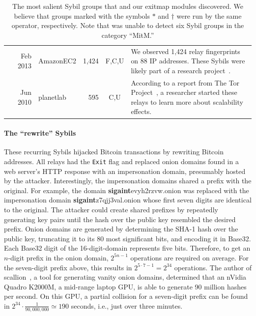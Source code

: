\begin{table}[ht!]
\begin{tabularx}{\textwidth}{l r l r c X}
& Feb 2013 & AmazonEC2 & 1,424 & \phantom{N,}F,C,U\phantom{,E} & We observed 1,424 relay fingerprints on
88 IP addresses.  These Sybils were likely part of a research
project~\cite{Biryukov2013a}. \\

& Jun 2010 & planetlab & 595 & \phantom{N,F,}C,U\phantom{,E} & According to a report from The Tor
Project~\cite{progressreport}, a researcher started these relays to learn more
about scalability effects. \\

\bottomrule

\end{tabularx}
\caption{The most salient Sybil groups that \sys and our exitmap modules
	discovered.  We believe that groups marked with the symbols $*$ and
	$\dagger$ were run by the same operator, respectively.  Note that \sys was
	unable to detect six Sybil groups in the category ``MitM.''}
\label{tab:sybils}
\end{table}

\paragraph{The ``rewrite'' Sybils}
These recurring Sybils hijacked Bitcoin transactions by rewriting Bitcoin
addresses.  All relays had the \texttt{Exit} flag and replaced onion domains
found in a web server's HTTP response with an impersonation domain, presumably
hosted by the attacker.  Interestingly, the impersonation domains shared a
prefix with the original.  For example, the domain
\textbf{sigaint}evyh2rzvw.onion was replaced with the impersonation domain
\textbf{sigaint}z7qjj3val.onion whose first seven digits are identical to the
original.  The attacker could create shared prefixes by repeatedly generating
key pairs until the hash over the public key resembled the desired prefix.
Onion domains are generated by determining the SHA-1 hash over the public key,
truncating it to its 80 most significant bits, and encoding it in Base32.  Each
Base32 digit of the 16-digit-domain represents five bits.  Therefore, to get an
$n$-digit prefix in the onion domain, $2^{5 n - 1}$ operations are required on
average.  For the seven-digit prefix above, this results in $2^{5 \cdot 7 - 1}
= 2^{34}$ operations.  The author of scallion~\cite{scallion}, a tool for
generating vanity onion domains, determined that an nVidia Quadro K2000M, a
mid-range laptop GPU, is able to generate 90 million hashes per second.  On
this GPU, a partial collision for a seven-digit prefix can be found in $2^{34}
\cdot \frac{1}{90,000,000} \simeq 190$ seconds, i.e., just over three minutes.

